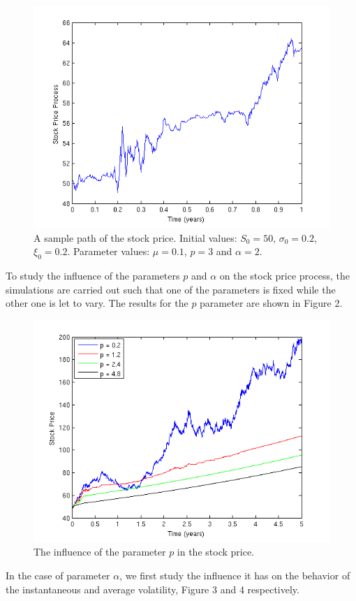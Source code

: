 \documentclass[11pt]{article}
\begin{document}
 \begin{figure}[width=3in, t]
\includegraphics{Figures/sample_path.png}
 \caption{A sample path of the stock price. Initial values: $S_0 = 50$, $\sigma_0 = 0.2$, $\xi_0 = 0.2$. Parameter values: $\mu = 0.1$, $p = 3$ and $\alpha = 2$.}
\end{figure}

To study the influence of the parameters $p$ and $\alpha$ on the stock price process, the simulations are carried out such that one of the parameters is fixed while the other one is let to vary.
The results for the $p$ parameter are shown in Figure 2.
\clearpage

 \begin{figure}[h]
 \includegraphics{Figures/p_effect.png}
 \caption{The influence of the parameter $p$ in the stock price.}
\end{figure}
In the case of parameter $\alpha$, we first study the influence it has on the behavior of the instantaneous and average volatility, Figure 3 and 4 respectively.
\end{document}
